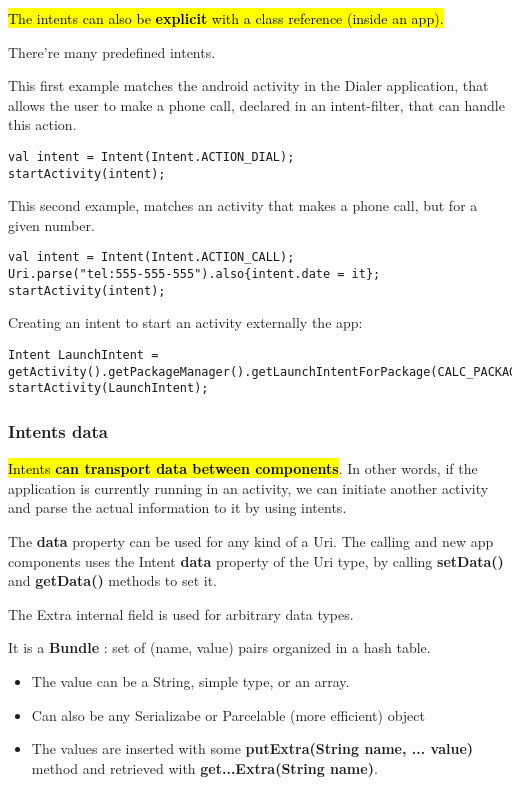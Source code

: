 \hl{The intents can also be \textbf{explicit} with a class reference (inside an app).}

There're many predefined intents. 

This first example matches the android activity in the Dialer application, that allows the 
user to make a phone call, declared in an intent-filter, that can handle this action.

\begin{lstlisting}
val intent = Intent(Intent.ACTION_DIAL);
startActivity(intent);
\end{lstlisting}

This second example, matches an activity that makes a phone call, but for a given number.
\begin{lstlisting}
val intent = Intent(Intent.ACTION_CALL);
Uri.parse("tel:555-555-555").also{intent.date = it};
startActivity(intent); 
\end{lstlisting}

Creating an intent to start an activity externally the app: 
\begin{lstlisting}
Intent LaunchIntent = getActivity().getPackageManager().getLaunchIntentForPackage(CALC_PACKAGE_NAME);
startActivity(LaunchIntent);
\end{lstlisting}


\subsubsection{Intents data}
\hl{Intents \textbf{can transport data between components}}. In other words, if the application is currently running in an activity,
we can initiate another activity and parse the actual information to it by using intents. 

The \textbf{data} property can be used for any kind of a Uri. The calling and new app components uses the Intent \textbf{data} property
of the Uri type, by calling \textbf{setData()} and \textbf{getData()} methods to set it. 

The Extra internal field is used for arbitrary data types. 

It is a \textbf{Bundle} : set of (name, value) pairs organized in a hash table.
\begin{itemize}
    \item The value can be a String, simple type, or an array.
    \item Can also be any Serializabe or Parcelable (more efficient) object
    \item The values are inserted with some \textbf{putExtra(String name, ... value)} method and retrieved
    with \textbf{get...Extra(String name)}.
\end{itemize}

